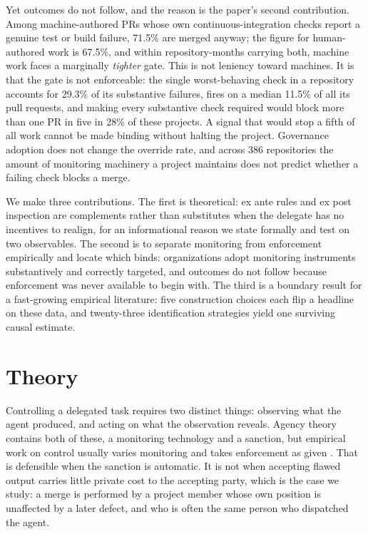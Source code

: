 \documentclass[mnsc]{informs4}
\begin{document}
Yet outcomes do not follow, and the reason is the paper's second contribution. Among machine-authored PRs whose own continuous-integration checks report a genuine
test or build failure, 71.5\% are merged anyway; the figure for human-authored work
is 67.5\%, and within repository-months carrying both, machine work faces a
marginally \emph{tighter} gate. This is not leniency toward machines. It is that
the gate is not enforceable: the single worst-behaving check in a repository
accounts for 29.3\% of its substantive failures, fires on a median 11.5\% of all
its pull requests, and making every substantive check required would block more
than one PR in five in 28\% of these projects. A signal that would stop a fifth of all work cannot be made binding
without halting the project. Governance adoption does not change the override rate, and
across 386 repositories the amount of monitoring machinery a project maintains does
not predict whether a failing check blocks a merge.

We make three contributions. The first is theoretical: ex ante rules and ex post
inspection are complements rather than substitutes when the delegate has no
incentives to realign, for an informational reason we state formally and test on
two observables. The second is to separate monitoring from enforcement empirically
and locate which binds: organizations adopt monitoring instruments substantively
and correctly targeted, and outcomes do not follow because enforcement was never
available to begin with. The third is a boundary result for a fast-growing
empirical literature: five construction choices each flip a headline on these data,
and twenty-three identification strategies yield one surviving causal estimate.

\section{Theory}
\label{sec:theory}

Controlling a delegated task requires two distinct things: observing what the agent
produced, and acting on what the observation reveals. Agency theory contains both of
these, a monitoring technology and a sanction, but empirical work on control
usually varies monitoring and takes enforcement as given
\citep{eisenhardt1985control}. That is defensible when the sanction is automatic. It is not when accepting flawed output carries little private cost to the accepting
party, which is the case we study: a merge is performed by a project member whose
own position is unaffected by a later defect, and who is often the same person who
dispatched the agent.
\end{document}
